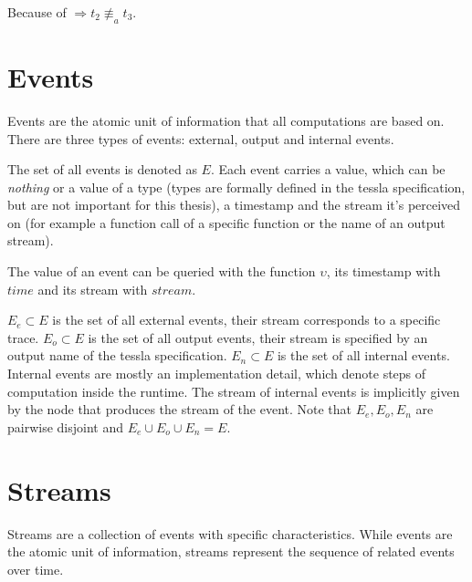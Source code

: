 \begin{exmp}[name=Observational Equivalence]
  Because of  \(\Rightarrow t_2 \not\equiv_a t_3\).

\end{exmp}


\section{Events}
\label{sec:definitions:events}

Events are the atomic unit of information that all computations are based on.
There are three types of events: external, output and internal events.

The set of all events is denoted as \(E\).
Each event carries a value, which can be \emph{nothing} or a value of a type (types are formally defined in the \gls{tessla} specification, but are not important for this thesis), a timestamp and the stream it's perceived on (for example a function call of a specific function or the name of an output stream).

The value of an event can be queried with the function \(\upsilon\), its timestamp with \(\mathit{time}\) and its stream with \(\mathit{stream}\).

\(E_e \subset E\) is the set of all external events, their stream corresponds to a specific trace.
\(E_o \subset E\) is the set of all output events, their stream is specified by an output name of the \gls{tessla} specification.
\(E_n \subset E\) is the set of all internal events.
Internal events are mostly an implementation detail, which denote steps of computation inside the runtime.
The stream of internal events is implicitly given by the node that produces the stream of the event.
Note that \(E_e, E_o, E_n\) are pairwise disjoint and \(E_e \cup E_o \cup E_n = E\).

\section{Streams}
\label{sec:definitions:streams}

Streams are a collection of events with specific characteristics.
While events are the atomic unit of information, streams represent the sequence of related events over time.


